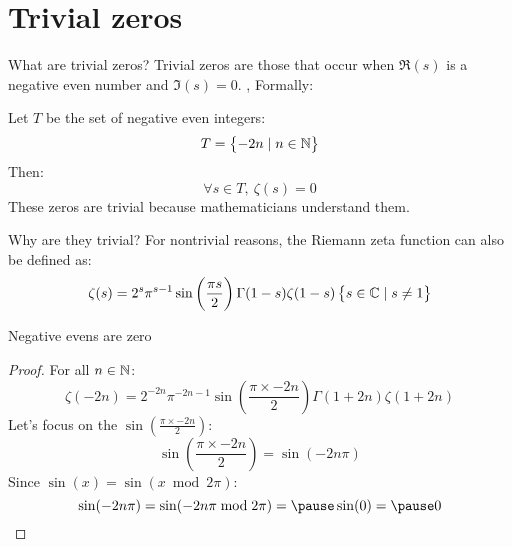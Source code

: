 \section{Trivial zeros}
\begin{namedframe}{What are trivial zeros?}
	Trivial zeros are those that occur when $\Re(s)$ is a negative even number and $\Im(s) = 0$.
	\sep
	Formally:

	Let $T$ be the set of negative even integers:
	\[T = \set{-2n \mid n \in \mathbb{N}}\]
	Then:
	\[\forall s \in T,\ \zeta(s) = 0\]
	\pause
	These zeros are \alert{trivial} because mathematicians understand them.
\end{namedframe}
\begin{namedframe}{Why are they trivial?}
	For nontrivial reasons, the Riemann zeta function can also be defined as:
	\[\zeta(s) = 2^s \pi^{s-1}\sin\left(\frac{\pi s}{2}\right) \Gamma(1 - s) \zeta(1-s) \set{s \in \mathbb{C}\mid s \neq 1}\]
\end{namedframe}
\begin{namedframe}{Negative evens are zero}
	\begin{proof}
		For all $n \in \mathbb{N}$:
		\[\zeta(-2n) = 2^{-2n} \pi^{-2n-1}\sin\left(\frac{\pi \times -2n}{2}\right) \Gamma(1+2n) \zeta(1+2n)\]
		\pause
		Let's focus on the $\sin\left(\frac{\pi \times -2n}{2}\right)$:
		\pause
		\[\sin\left(\frac{\pi \times -2n}{2}\right) = \sin(-2n\pi)\]
		\pause
		Since $\sin(x) = \sin(x \bmod 2\pi)$:
		\pause
		\[\sin(-2n\pi) =\sin(-2n\pi \bmod 2\pi) =\pause \sin(0) =\pause 0 \qedhere\]
	\end{proof}
\end{namedframe}
